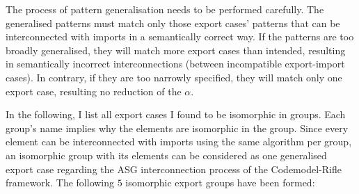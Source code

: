 The process of pattern generalisation needs to be performed carefully. The generalised patterns must match only those export cases' patterns that can be interconnected with imports in a semantically correct way. If the patterns are too broadly generalised, they will match more export cases than intended, resulting in semantically incorrect interconnections (between incompatible export-import cases). In contrary, if they are too narrowly specified, they will match only one export case, resulting no reduction of the $\alpha$.

In the following, I list all export cases I found to be isomorphic in groups. Each group's name implies why the elements are isomorphic in the group. Since every element can be interconnected with imports using the same algorithm per group, an isomorphic group with its elements can be considered as one generalised export case regarding the ASG interconnection process of the Codemodel-Rifle framework. The following $5$ isomorphic export groups have been formed:

